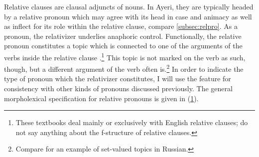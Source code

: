 Relative clauses are clausal adjuncts of nouns. In Ayeri, they are typically
headed by a relative pronoun which may agree with its head in case and animacy
as well as inflect for its role within the relative clause, compare
\autoref{subsec:relpro}. As a pronoun, the relativizer underlies anaphoric
control. Functionally, the relative pronoun constitutes a topic which is
connected to one of the arguments of the verbs inside the relative clause
\parencites[56--58]{butt1999}[400--405]{dalrymple2001}[161--165]
{falk2001}.\footnote{These textbooks deal mainly or exclusively with English
relative clauses; \citet{bresnan2016} do not say anything about the f-structure
of relative clauses.} This topic is not marked on the verb as such, though, but
a different argument of the verb often is.\footnote{Compare \citet[70--71]
{bresnan2016} for an example of set-valued topics in Russian.} In order to
indicate the type of pronoun which the relativizer constitutes, I will use the
\Prontype{} feature for consistency with other kinds of pronouns discussed
previously. The general morpholexical specification for relative pronouns is
given in (\ref{ex:relpromorphlex}).

\begin{figure}
\begin{morphlex}
\ex\label{ex:relpromorphlex}
\xe
\end{morphlex}
\end{figure}

